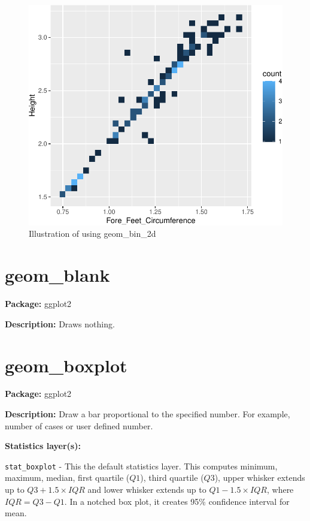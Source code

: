 \documentclass[
]{book}
\begin{document}
\begin{figure}
\centering
\includegraphics{Data-Visualisation-geom-Encyclopedia_files/figure-latex/unnamed-chunk-25-1.pdf}
\caption{\label{fig:unnamed-chunk-25}Illustration of using geom\_bin\_2d}
\end{figure}

\hypertarget{geom_blank}{%
\section{geom\_blank}\label{geom_blank}}

\textbf{Package: } ggplot2 \autocite{R-ggplot2}

\textbf{Description: } Draws nothing.

\hypertarget{geom_boxplot}{%
\section{geom\_boxplot}\label{geom_boxplot}}

\textbf{Package: } ggplot2 \autocite{R-ggplot2}

\textbf{Description: } Draw a bar proportional to the specified number. For example, number of cases or user defined number.

\textbf{Statistics layer(s): }

\texttt{stat\_boxplot} - This the default statistics layer. This computes minimum, maximum, median, first quartile (\(Q1\)), third quartile (\(Q3\)), upper whisker extends up to \(Q3 + 1.5 \times IQR\) and lower whisker extends up to \(Q1 - 1.5 \times IQR\), where \(IQR = Q3 - Q1\). In a notched box plot, it creates 95\% confidence interval for mean.
\end{document}
